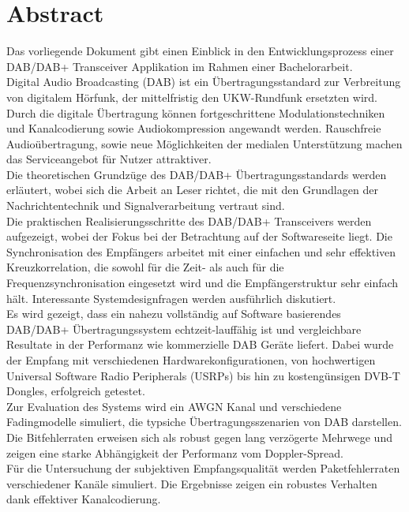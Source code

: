 \chapter*{Abstract}
Das vorliegende Dokument gibt einen Einblick in den Entwicklungsprozess einer DAB/DAB+ Transceiver Applikation im Rahmen einer Bachelorarbeit.\\ Digital Audio Broadcasting (DAB) ist ein Übertragungsstandard zur Verbreitung von digitalem Hörfunk, der mittelfristig den UKW-Rundfunk ersetzten wird. Durch die digitale Übertragung können fortgeschrittene Modulationstechniken und Kanalcodierung sowie Audiokompression angewandt werden. Rauschfreie Audioübertragung, sowie neue Möglichkeiten der medialen Unterstützung machen das Serviceangebot für Nutzer attraktiver.\\
Die theoretischen Grundzüge des DAB/DAB+ Übertragungsstandards werden erläutert, wobei sich die Arbeit an Leser richtet, die mit den Grundlagen der Nachrichtentechnik und Signalverarbeitung vertraut sind.\\

Die praktischen Realisierungsschritte des DAB/DAB+ Transceivers werden aufgezeigt, wobei der Fokus bei der Betrachtung auf der Softwareseite liegt. Die Synchronisation des Empfängers arbeitet mit einer einfachen und sehr effektiven Kreuzkorrelation, die sowohl für die Zeit- als auch für die Frequenzsynchronisation eingesetzt wird und die Empfängerstruktur sehr einfach hält. Interessante Systemdesignfragen werden ausführlich diskutiert.\\

Es wird gezeigt, dass ein nahezu vollständig auf Software basierendes DAB/DAB+ Übertragungssystem echtzeit-lauffähig ist und vergleichbare Resultate in der Performanz wie kommerzielle DAB Geräte liefert. Dabei wurde der Empfang mit verschiedenen Hardwarekonfigurationen, von hochwertigen Universal Software Radio Peripherals (USRPs) bis hin zu kostengünsigen DVB-T Dongles, erfolgreich getestet.\\

Zur Evaluation des Systems wird ein AWGN Kanal und verschiedene Fadingmodelle simuliert, die typsiche Übertragungsszenarien von DAB darstellen. Die Bitfehlerraten erweisen sich als robust gegen lang verzögerte Mehrwege und zeigen eine starke Abhängigkeit der Performanz vom Doppler-Spread.\\
Für die Untersuchung der subjektiven Empfangsqualität werden Paketfehlerraten verschiedener Kanäle simuliert. Die Ergebnisse zeigen ein robustes Verhalten dank effektiver Kanalcodierung.